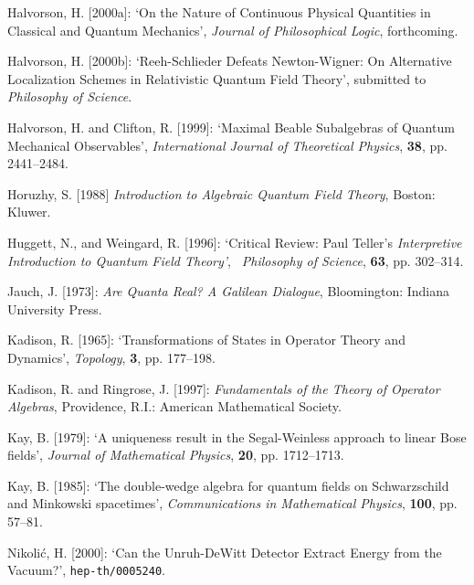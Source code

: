\documentclass[12pt]{article}
\theoremstyle{remark}
\theoremstyle{definition}
\begin{document}
\noindent Halvorson, H. [2000a]: `On the Nature of Continuous Physical Quantities 
in Classical and Quantum
Mechanics', \emph{Journal of Philosophical Logic}, forthcoming.\vspace{.1in}

\noindent Halvorson, H. [2000b]: `Reeh-Schlieder Defeats 
Newton-Wigner: On Alternative Localization Schemes in Relativistic 
Quantum Field Theory', submitted to \textit{Philosophy of 
Science}.\vspace{.1in}

\noindent Halvorson, H. and Clifton, R. [1999]: `Maximal Beable 
Subalgebras of Quantum Mechanical Observables', \emph{International 
Journal of Theoretical Physics}, \textbf{38}, pp. 
2441--2484.\vspace{.1in} 

\noindent Horuzhy, S. [1988] {\it Introduction to Algebraic Quantum Field
  Theory}, Boston: Kluwer. \vspace{.1in} 

\noindent Huggett, N., and Weingard, R. [1996]: `Critical Review: Paul Teller's 
\textit{Interpretive Introduction to Quantum Field Theory'}, \textit{\
Philosophy of Science}, \textbf{63}, pp. 302--314.\vspace{.1in}

\noindent Jauch, J. [1973]: \textit{Are Quanta Real? A Galilean Dialogue},
Bloomington: Indiana University Press.\vspace{.1in}

\noindent Kadison, R. [1965]: `Transformations of States in Operator Theory and 
Dynamics', \textit{Topology}, \textbf{3}, pp. 177--198.\vspace{.1in}

\noindent Kadison, R. and Ringrose, J. [1997]: {\it Fundamentals of the Theory
  of Operator Algebras}, Providence, R.I.: American Mathematical
Society.\vspace{.1in}

\noindent Kay, B. [1979]: `A uniqueness result in the Segal-Weinless approach
to linear Bose fields', {\it Journal of Mathematical Physics}, {\bf
  20}, pp. 1712--1713.\vspace{.1in}

\noindent Kay, B. [1985]: `The double-wedge algebra for quantum fields on
Schwarzschild and Minkowski spacetimes', {\it Communications in
  Mathematical Physics}, {\bf 100}, pp. 57--81.\vspace{.1in}
  
  \noindent Nikoli\'{c}, H. [2000]: `Can the Unruh-DeWitt Detector 
  Extract Energy from the Vacuum?', {\tt hep-th/0005240}.\vspace{.1in}
  
\end{document}
